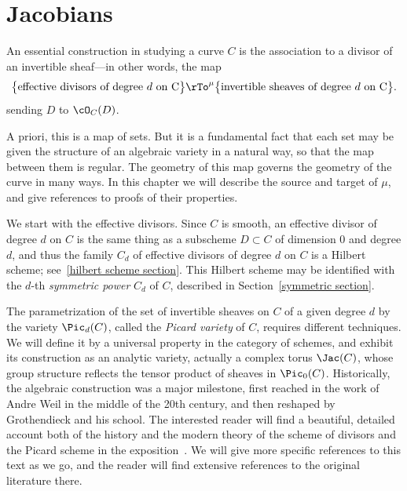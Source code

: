 

\chapter{Jacobians}\label{Jacobians chapter}\label{new Jacobians chapter}\label{JacobianChapter}


An essential construction in studying a curve $C$ is the association to a divisor  of an invertible sheaf---in other words, the map
$$
\big\{ \text{effective divisors of degree $d$ on C}\big\} \rTo^\mu \big\{ \text{invertible sheaves of degree $d$ on C} \big\}.
$$
sending $D$ to $\cO_C(D)$.

A priori, this is a map of sets. But it is a fundamental fact that each set may  be given the structure of an algebraic variety in a natural way, so that the map between them is regular. The geometry of this map governs the geometry of the curve in many ways.
In this chapter we will describe the source and target of $\mu$, and give references to proofs of their properties. 

We start with the effective divisors. Since $C$ is smooth, an effective divisor of degree $d$ on $C$ is the same thing as a subscheme $D \subset C$ of dimension 0 and degree $d$, and thus
the family $C_d$ of effective divisors of degree $d$ on $C$ is a Hilbert scheme; see~\ref{hilbert scheme section}. This Hilbert scheme may be identified with
the $d$-th \emph{symmetric power} $C_d$  of $C$, described in Section~\ref{symmetric section}. 

The parametrization of the set of invertible sheaves on $C$ of a given degree $d$ by the variety $\Pic_d(C)$, called the \emph{Picard variety} of $C$, requires different techniques. We will define it by a universal property in the category of schemes, and exhibit its construction as an analytic variety, actually a complex torus $\Jac(C)$, whose group structure reflects the tensor product of
sheaves in $\Pic_0(C)$.
Historically, the algebraic construction was a major milestone, first reached in the work of Andre Weil in the middle of
the 20th century, and then reshaped by Grothendieck and his school. The interested reader will find a beautiful, detailed account both of the history and the 
modern theory of the scheme of divisors and the Picard scheme in the exposition~\cite{Kleiman-PicardScheme}. We will give
more specific references to this text as we go, and the reader will find extensive references to the original literature there.

